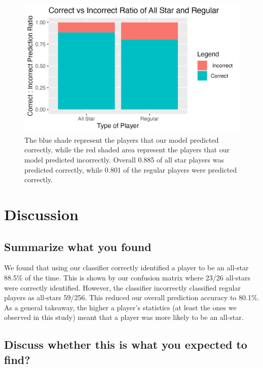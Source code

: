 \documentclass[
]{article}
\begin{document}
\begin{figure}
\includegraphics[width=0.8\linewidth]{results/confusion_graph} \caption{The blue shade represent the players that our model predicted correctly, while the red shaded area represent the players that our model predicted incorrectly. Overall 0.885 of all star players was predicted correctly, while 0.801 of the regular players were predicted correctly.}\label{fig:fig2}
\end{figure}

\hypertarget{discussion}{%
\section{Discussion}\label{discussion}}

\hypertarget{summarize-what-you-found}{%
\subsection{Summarize what you found}\label{summarize-what-you-found}}

We found that using our classifier correctly identified a player to be an all-star 88.5\% of the time. This is shown by our confusion matrix where 23/26 all-stars were correctly identified. However, the classifier incorrectly classified regular players as all-stars 59/256. This reduced our overall prediction accuracy to 80.1\%. As a general takeaway, the higher a player's statistics (at least the ones we observed in this study) meant that a player was more likely to be an all-star.

\hypertarget{discuss-whether-this-is-what-you-expected-to-find}{%
\subsection{Discuss whether this is what you expected to find?}\label{discuss-whether-this-is-what-you-expected-to-find}}
\end{document}
